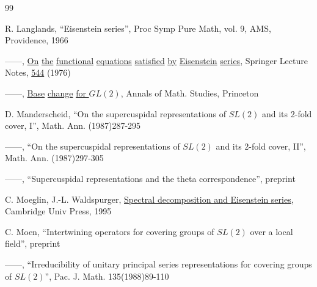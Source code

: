 \documentclass[12pt,letterpaper]{book}
\theoremstyle{plain}
\theoremstyle{definition}
\theoremstyle{remark}
\theoremstyle{remark}
\begin{document}
\begin{thebibliography}{99}

 R. Langlands, ``Eisenstein series'', Proc Symp Pure Math,
vol. 9, AMS, Providence, 1966

 ------, \underline{On} \underline{the} \underline{functional}
\underline{equations} \underline{satisfied}
\underline{by} \underline{Eisenstein}
\underline{series}, Springer Lecture Notes, \underline{544} (1976)


 ------, \underline{Base} \underline{change}
\underline{for $GL(2)$},
Annals of Math. Studies, Princeton





 D. Manderscheid, ``On the supercuspidal representations of
$SL(2)$ and its 2-fold cover, I'', Math. Ann. (1987)287-295

 ------, ``On the supercuspidal representations of
$SL(2)$ and its 2-fold cover, II'', Math. Ann.
(1987)297-305

 ------, ``Supercuspidal representations and the
theta correspondence'', preprint

 C. Moeglin, J.-L. Waldspurger,
\underline{Spectral decomposition and Eisenstein series},
Cambridge Univ Press, 1995

 C. Moen, ``Intertwining operators for covering groups
of $SL(2)$ over
a local field'', preprint

 ------, ``Irreducibility of unitary principal series
representations
for covering groups of $SL(2)$'', Pac. J. Math. 135(1988)89-110


\end{thebibliography}
\end{document}
